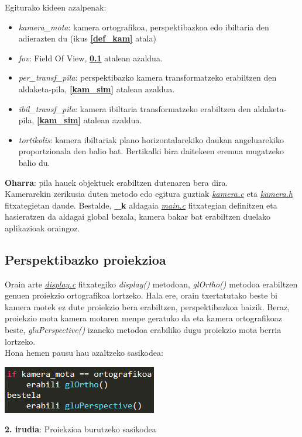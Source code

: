 \documentclass[12pt]{article}
\newcommand{\fitxategi}[1] {\underline{\textit{#1}}}
\newcommand{\metodo}[1] {\textit{#1}}
\newcommand{\aldagai}[1] {\textit{#1}}
\newcommand{\erref}[1] {\textbf{\ref{#1}}}
\begin{document}
Egiturako kideen azalpenak:

\begin{itemize}
\item \aldagai{kamera\_mota}: kamera ortografikoa, perspektibazkoa edo ibiltaria den adierazten du (ikus \erref{def_kam} atala)
\item \aldagai{fov}: Field Of View\cite{fov}, \erref{per_proj} atalean azaldua.
\item \aldagai{per\_transf\_pila}: perspektibazko kamera transformatzeko erabiltzen den aldaketa-pila, \erref{kam_sim} atalean azaldua.
\item \aldagai{ibil\_transf\_pila}: kamera ibiltaria transformatzeko erabiltzen den aldaketa-pila, \erref{kam_sim} atalean azaldua.
\item \aldagai{tortikolis}: kamera ibiltariak plano horizontalarekiko daukan angeluarekiko proportzionala den balio bat. Bertikalki bira daitekeen eremua mugatzeko balio du.
\end{itemize}

\textbf{Oharra}: pila hauek objektuek erabiltzen dutenaren bera dira.\\

Kamerarekin zerikusia duten metodo edo egitura guztiak \fitxategi{kamera.c} eta \fitxategi{kamera.h} fitxategietan daude.
Bestalde, \textbf{\_k} aldagaia \fitxategi{main.c} fitxategian definitzen eta hasieratzen da aldagai global bezala, kamera bakar bat erabiltzen duelako aplikazioak oraingoz.


\subsection{Perspektibazko proiekzioa}\label{per_proj}
Orain arte \fitxategi{display.c} fitxategiko \metodo{display()} metodoan, \metodo{glOrtho()} metodoa erabiltzen genuen proiekzio ortografikoa lortzeko. Hala ere, orain txertatutako beste bi kamera motek ez dute proiekzio bera erabiltzen, perspektibazkoa baizik. Beraz, proiekzio mota kamera motaren menpe geratuko da eta kamera ortografikoaz beste, \metodo{gluPerspective()}\cite{glu_perspective} izaneko metodoa erabiliko dugu proiekzio mota berria lortzeko.\\
Hona hemen pausu hau azaltzeko sasikodea:

\begin{center}
\includegraphics[scale=1]{kamera_projection.png}

\textbf{2. irudia}: Proiekzioa burutzeko sasikodea
\end{center}
\end{document}
